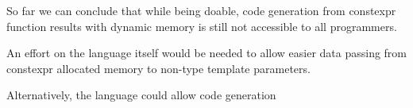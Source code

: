 \documentclass[../main]{subfiles}
\begin{document}
So far we can conclude that while being doable, code generation from \gls{constexpr}
function results with dynamic memory is still not accessible to all \cpp
programmers.

An effort on the language itself would be needed to allow easier data passing
from \gls{constexpr} allocated memory to non-type template parameters.

Alternatively, the language could allow code generation
\end{document}

